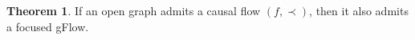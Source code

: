 \documentclass[a4paper,onecolumn,superscriptaddress,11pt,accepted=2020-04-27]{quantumarticle}
\newcommand{\CX}{\ensuremath{\textrm{CNOT}}\xspace}
\newcommand{\CNOT}{\CX}
\theoremstyle{definition}
\newtheorem{theorem}{Theorem}[section]
\newtheorem{proposition}[theorem]{Proposition}
\newtheorem{definition}[theorem]{Definition}
\newtheorem{remark}[theorem]{Remark}
\begin{document}
\begin{theorem}\label{thm:causal-implies-focused}
If an open graph admits a causal flow $(f,\prec)$, then it also admits a focused gFlow.
\end{theorem}








\end{document}
